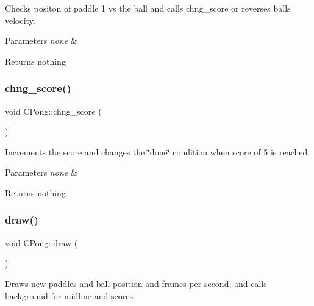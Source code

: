 Checks positon of paddle 1 vs the ball and calls chng\+\_\+score or reverses balls velocity. 


\begin{DoxyParams}{Parameters}
{\em none} & \\
\hline
\end{DoxyParams}
\begin{DoxyReturn}{Returns}
nothing 
\end{DoxyReturn}
\hypertarget{class_c_pong_a310107b0dc9d4a036bc931f75be96140}{}\label{class_c_pong_a310107b0dc9d4a036bc931f75be96140} 
\subsubsection{\texorpdfstring{chng\+\_\+score()}{chng\_score()}}
{\footnotesize\ttfamily void C\+Pong\+::chng\+\_\+score (\begin{DoxyParamCaption}{ }\end{DoxyParamCaption})\hspace{0.3cm}{\ttfamily [private]}}



Increments the score and changes the \char`\"{}done\char`\"{} condition when score of 5 is reached. 


\begin{DoxyParams}{Parameters}
{\em none} & \\
\hline
\end{DoxyParams}
\begin{DoxyReturn}{Returns}
nothing 
\end{DoxyReturn}
\hypertarget{class_c_pong_ae5c14ff09d074474ffd4f220b21dc00f}{}\label{class_c_pong_ae5c14ff09d074474ffd4f220b21dc00f} 
\subsubsection{\texorpdfstring{draw()}{draw()}}
{\footnotesize\ttfamily void C\+Pong\+::draw (\begin{DoxyParamCaption}{ }\end{DoxyParamCaption})\hspace{0.3cm}{\ttfamily [virtual]}}



Draws new paddles and ball position and frames per second, and calls background for midline and scores. 


